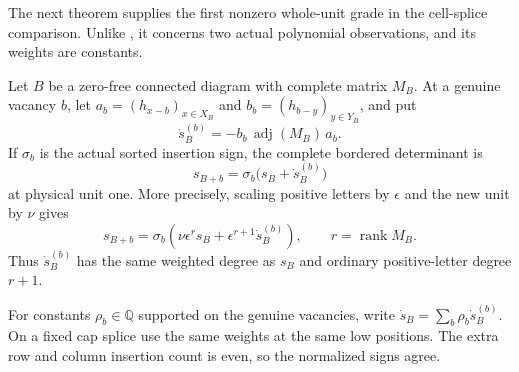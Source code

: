 \documentclass[11pt,a4paper]{amsart}
\numberwithin{equation}{section}
\theoremstyle{plain}
\theoremstyle{definition}
\newcommand{\Q}{\mathbb Q}
\begin{document}
The next theorem supplies the first nonzero whole-unit grade in the
cell-splice comparison.  Unlike , it concerns
two actual polynomial observations, and its weights are constants.

Let \(B\) be a zero-free connected diagram with complete matrix \(M_B\).
At a genuine vacancy \(b\), let
\(a_b=(h_{x-b})_{x\in X_B}\) and
\(b_b=(h_{b-y})_{y\in Y_B}\), and put
\begin{equation}\label{sc:restoration-polynomial}
 \dot s_B^{(b)}=-b_b\,\operatorname{adj}(M_B)\,a_b.
\end{equation}
If \(\sigma_b\) is the actual sorted insertion sign, the complete
bordered determinant is
\[
 s_{B+b}=\sigma_b\bigl(s_B+\dot s_B^{(b)}\bigr)
\]
at physical unit one.  More precisely, scaling positive letters by
\(\epsilon\) and the new unit by \(\nu\) gives
\begin{equation}\label{sc:bordered-grade}
 s_{B+b}=\sigma_b\left(
 \nu\epsilon^r s_B+\epsilon^{r+1}\dot s_B^{(b)}\right),
 \qquad r=\operatorname{rank}M_B.
\end{equation}
Thus \(\dot s_B^{(b)}\) has the same weighted degree as \(s_B\) and
ordinary positive-letter degree \(r+1\).

For constants \(\rho_b\in\Q\) supported on the genuine vacancies,
write \(\dot s_B=\sum_b\rho_b\dot s_B^{(b)}\).  On a fixed cap
splice use the same weights at the same low positions.  The extra
row and column insertion count is even, so the normalized signs
agree.
\end{document}
